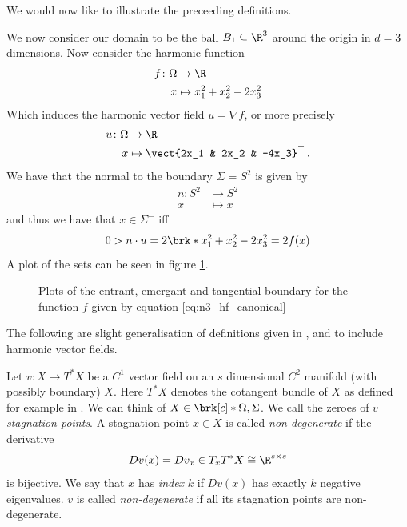 We would now like to illustrate the preceeding definitions.
\begin{example}\label{ex:n3_hvf_canonical}
  We now consider our domain to be the ball $B_1\subseteq\R^3$ around the origin in $d=3$ dimensions.
  Now consider the harmonic function
  \begin{equation}
    \begin{aligned}
    f\colon \Omega&\to\R \\
    x&\mapsto x_1^2+x_2^2-2x_3^2\label{eq:n3_hf_canonical}
    \end{aligned}
  \end{equation}
  Which induces the harmonic vector field $u=\nabla f$, or more precisely
  \begin{equation}
    \begin{aligned}
    u\colon \Omega&\to\R \\
    x&\mapsto \vect{2x_1 & 2x_2 & -4x_3}^\top\,.\label{eq:n3_hvf_canonical}
    \end{aligned}
  \end{equation}
  We have that the normal to the boundary $\Sigma=S^2$ is given by
  \begin{align*}
    n\colon S^2&\to S^2 \\
    x&\mapsto x
  \end{align*}
  and thus we have that $x\in\Sigma^-$ iff 
  \begin{align*}
    0>n\cdot u = 2\brk*{x_1^2+x_2^2-2x_3^2}=2f(x)
  \end{align*}
  A plot of the sets can be seen in figure \ref{pl:n3_hvf_canonical_boundary}.
  \begin{figure}
    \centering
    \missingfigure[figwidth=0.7\textwidth]{}
    \caption{Plots of the entrant, emergant and tangential boundary for the
      function $f$ given by equation \eqref{eq:n3_hf_canonical}}
    \label{pl:n3_hvf_canonical_boundary}
  \end{figure}
\end{example}

The following are slight generalisation of definitions given in \cite[p.138f]{Shelton1980}, \cite[§5]{Morse1969} and \cite[p.282f]{Morse1970}
to include harmonic vector fields.
\begin{definition}\label{df:nonDegeneracy}
  Let $v\colon X\to T^*X$ be a $C^1$ vector field on an $s$ dimensional $C^2$ manifold (with possibly boundary) $X$.
  Here $T^*X$ denotes the
  cotangent bundle of $X$ as defined for example in \cite[Chapter 6]{Hirsch1994}.
  We can think of $X\in\brk[c]*{\Omega,\Sigma}$.
  We call the zeroes of $v$ \emph{stagnation points}. A stagnation point $x\in X$ is called
  \emph{non-degenerate} if the derivative $$Dv(x)=Dv_x\in T_xT^*X\cong \R^{s\times s}$$ is bijective. We say that $x$ has \emph{index} $k$
  if $Dv(x)$ has exactly $k$ negative eigenvalues. $v$ is called \emph{non-degenerate} if all its stagnation points
  are non-degenerate.
\end{definition}

